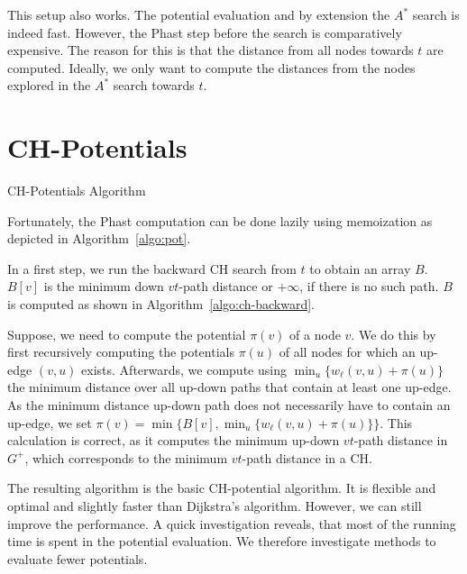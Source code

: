\documentclass[a4paper,UKenglish,cleveref, autoref]{lipics-v2019}
\begin{document}
This setup also works.
The potential evaluation and by extension the $A^*$ search is indeed fast.
However, the Phast step before the search is comparatively expensive.
The reason for this is that the distance from all nodes towards $t$ are computed.
Ideally, we only want to compute the distances from the nodes explored in the $A^*$ search towards $t$.

\section{CH-Potentials}

\begin{algorithm2e}
\caption{CH-Potentials Algorithm}
\label{algo:pot}
\end{algorithm2e}

Fortunately, the Phast computation can be done lazily using memoization as depicted in Algorithm~\ref{algo:pot}.

In a first step, we run the backward CH search from $t$ to obtain an array $B$.
$B[v]$ is the minimum down $vt$-path distance or $+\infty$, if there is no such path.
$B$ is computed as shown in Algorithm~\ref{algo:ch-backward}.

Suppose, we need to compute the potential $\pi(v)$ of a node $v$.
We do this by first recursively computing the potentials $\pi(u)$ of all nodes for which an up-edge $(v,u)$ exists.
Afterwards, we compute using $\min_u\{w_\ell(v,u) + \pi(u)\}$ the minimum distance over all up-down paths that contain at least one up-edge.
As the minimum distance up-down path does not necessarily have to contain an up-edge, we set $\pi(v) = \min \{ B[v], \min_u\{w_\ell(v,u) + \pi(u)\} \}$.
This calculation is correct, as it computes the minimum up-down $vt$-path distance in $G^+$, which corresponds to the minimum $vt$-path distance in a CH.

The resulting algorithm is the basic CH-potential algorithm.
It is flexible and optimal and slightly faster than Dijkstra's algorithm.
However, we can still improve the performance.
A quick investigation reveals, that most of the running time is spent in the potential evaluation.
We therefore investigate methods to evaluate fewer potentials.
\end{document}
